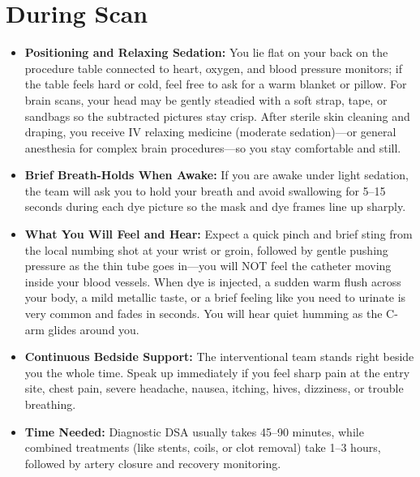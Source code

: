 \section{During Scan}
\begin{itemize}
\item \textbf{Positioning and Relaxing Sedation:} You lie flat on your back on the procedure table connected to heart, oxygen, and blood pressure monitors; if the table feels hard or cold, feel free to ask for a warm blanket or pillow. For brain scans, your head may be gently steadied with a soft strap, tape, or sandbags so the subtracted pictures stay crisp. After sterile skin cleaning and draping, you receive IV relaxing medicine (moderate sedation)---or general anesthesia for complex brain procedures---so you stay comfortable and still.
\item \textbf{Brief Breath-Holds When Awake:} If you are awake under light sedation, the team will ask you to hold your breath and avoid swallowing for 5--15 seconds during each dye picture so the mask and dye frames line up sharply.
\item \textbf{What You Will Feel and Hear:} Expect a quick pinch and brief sting from the local numbing shot at your wrist or groin, followed by gentle pushing pressure as the thin tube goes in---you will NOT feel the catheter moving inside your blood vessels. When dye is injected, a sudden warm flush across your body, a mild metallic taste, or a brief feeling like you need to urinate is very common and fades in seconds. You will hear quiet humming as the C-arm glides around you.
\item \textbf{Continuous Bedside Support:} The interventional team stands right beside you the whole time. Speak up immediately if you feel sharp pain at the entry site, chest pain, severe headache, nausea, itching, hives, dizziness, or trouble breathing.
\item \textbf{Time Needed:} Diagnostic DSA usually takes 45--90 minutes, while combined treatments (like stents, coils, or clot removal) take 1--3 hours, followed by artery closure and recovery monitoring.
\end{itemize}

